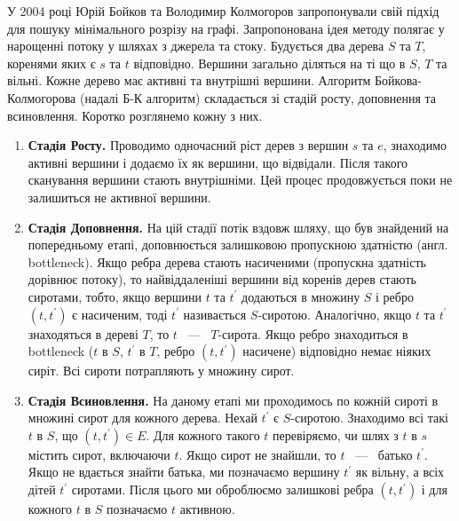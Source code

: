 У 2004 році Юрій Бойков та Володимир Колмогоров запропонували свій підхід \cite{bib:boykov_kolmogorov}
для пошуку мінімального розрізу на графі.
Запропонована ідея методу полягає у нарощенні потоку у шляхах з джерела та стоку.
Будується два дерева $S$ та $T$, коренями яких є $s$ та $t$ відповідно.
Вершини загально діляться на ті що в $S$, $T$ та
вільні. Кожне дерево має активні та внутрішні вершини.
Алгоритм Бойкова-Колмогорова (надалі Б-К алгоритм) складається зі стадій росту,
доповнення та всиновлення.
Коротко розглянемо кожну з них.
\begin{enumerate}
    \item \textbf{Стадія Росту.}
          Проводимо одночасний ріст дерев з вершин $s$ та $e$, знаходимо активні
          вершини і додаємо їх як вершини, що відвідали. Після такого сканування вершини
          стають внутрішніми. Цей процес продовжується поки не залишиться не активної вершини.
    \item \textbf{Стадія Доповнення.}
          На цій стадії потік вздовж шляху, що був знайдений на попередньому етапі,
          доповнюється залишковою пропускною здатністю (англ. bottleneck). Якщо ребра дерева стають
          насиченими (пропускна здатність дорівнює потоку), то найвіддаленіші вершини від коренів дерев стають
          сиротами, тобто, якщо вершини $t$ та $t^{'}$ додаються в множину $S$
          і ребро $(t,t^{'})$ є насиченим, тоді $t^{'}$ називається $S$-сиротою.
          Аналогічно, якщо $t$ та $t^{'}$ знаходяться в дереві $T$, то  $t$ ~---~ $T$-сирота.
          Якщо ребро знаходиться в bottleneck ($t$ в $S$, $t^{'}$ в $T$, ребро $(t,t^{'})$
          насичене) відповідно немає ніяких сиріт. Всі сироти потрапляють у множину сирот.
    \item \textbf{Стадія Всиновлення.}
          На даному етапі ми проходимось по кожній сироті в множині сирот для кожного дерева.
          Нехай $t^{'}$ є $S$-сиротою. Знаходимо всі такі $t$  в $S$, що
          $(t, t^{'}) \in E$. Для кожного такого $t$ перевіряємо, чи шлях з $t$ в $s$ містить сирот,
          включаючи $t$. Якщо сирот не знайшли, то $t$ ~---~ батько  $t^{'}$.
          Якщо не вдається знайти батька, ми позначаємо вершину $t^{'}$ як вільну, а всіх
          дітей $t^{'}$ сиротами. Після цього ми оброблюємо залишкові ребра $(t,t^{'})$ і для кожного $t$ в $S$ позначаємо
          $t$ активною.
\end{enumerate}

